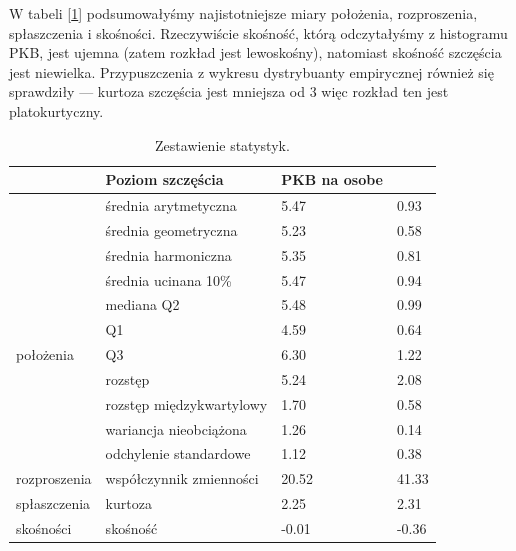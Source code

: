 \documentclass{article}
\theoremstyle{break}
\begin{document}
W tabeli [\ref{table}] podsumowałyśmy najistotniejsze miary położenia, rozproszenia, spłaszczenia i skośności. Rzeczywiście skośność, którą odczytałyśmy z histogramu PKB, jest ujemna (zatem rozkład jest lewoskośny), natomiast skośność szczęścia jest niewielka. Przypuszczenia z wykresu dystrybuanty empirycznej również się sprawdziły --- kurtoza szczęścia jest mniejsza od 3 więc rozkład ten jest platokurtyczny. 


\begin{table}[H]
	\centering
	\begin{tabular}{|ll|l|l|}
		\hline
		\rowcolor[HTML]{C0C0C0} 
		\multicolumn{2}{|l|}{\cellcolor[HTML]{C0C0C0}Miary}                             & Poziom szczęścia & PKB na osobe \\ \hline
		\multicolumn{1}{|l|}{}                               & średnia arytmetyczna     & 5.47             & 0.93         \\ \cline{2-4} 
		\multicolumn{1}{|l|}{}                               & średnia geometryczna     & 5.23             & 0.58         \\ \cline{2-4} 
		\multicolumn{1}{|l|}{}                               & średnia harmoniczna      & 5.35             & 0.81         \\ \cline{2-4} 
		\multicolumn{1}{|l|}{}                               & średnia ucinana 10\%     & 5.47             & 0.94         \\ \cline{2-4} 
		\multicolumn{1}{|l|}{}                               & mediana Q2               & 5.48             & 0.99         \\ \cline{2-4} 
		\multicolumn{1}{|l|}{}                               & Q1                       & 4.59             & 0.64         \\ \cline{2-4} 
		\multicolumn{1}{|l|}{położenia}    & Q3                       & 6.30             & 1.22         \\ \hline
		\multicolumn{1}{|l|}{}                               & rozstęp                  & 5.24             & 2.08         \\ \cline{2-4} 
		\multicolumn{1}{|l|}{}                               & rozstęp międzykwartylowy & 1.70             & 0.58         \\ \cline{2-4} 
		\multicolumn{1}{|l|}{}                               & wariancja nieobciążona   & 1.26             & 0.14         \\ \cline{2-4} 
		\multicolumn{1}{|l|}{}                               & odchylenie standardowe   & 1.12             & 0.38         \\ \cline{2-4} 
		\multicolumn{1}{|l|}{rozproszenia} & współczynnik zmienności  & 20.52            & 41.33        \\ \hline
		\multicolumn{1}{|l|}{spłaszczenia}                   & kurtoza                  & 2.25             & 2.31         \\ \hline
		\multicolumn{1}{|l|}{skośności}                      & skośność                 & -0.01            & -0.36        \\ \hline
	\end{tabular}
\caption{Zestawienie statystyk.}
\label{table}
\end{table}
	
\end{document}
